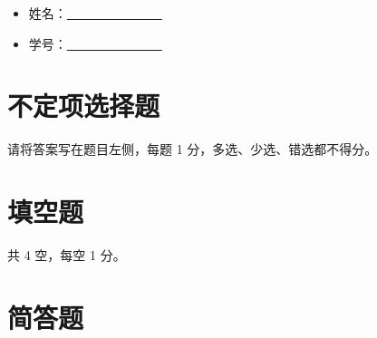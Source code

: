 \documentclass[a4]{article}
\begin{document}
\begin{itemize}
	\item 姓名：\underline{\quad~~~~~~~~~~~~~~~}
	\item 学号：\underline{\quad~~~~~~~~~~~~~~~}
\end{itemize}

\section{不定项选择题}

请将答案写在题目左侧，每题 1 分，多选、少选、错选都不得分。








\section{填空题}

共 4 空，每空 1 分。




\section{简答题}


\quad \\[1cm]

\quad \\[1cm]

\end{document}
